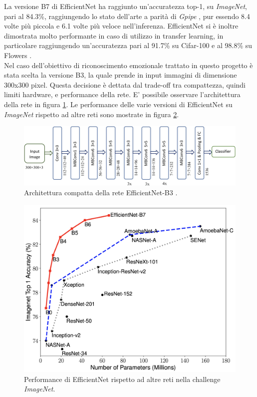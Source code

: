 \documentclass[11pt]{report}
\begin{document}
        La versione B7 di EfficientNet ha raggiunto un'accuratezza top-1, su \textit{ImageNet}, pari al 84.3\%, raggiungendo lo stato dell'arte a parità di \textit{Gpipe} \cite{huang2019gpipe}, pur essendo 8.4 volte più piccola e 6.1 volte più veloce nell'inferenza.
        EfficientNet si è inoltre dimostrata molto performante in caso di utilizzo in transfer learning, in particolare raggiungendo un'accuratezza pari al 91.7\% su Cifar-100 \cite{cifar} e al 98.8\% su Flowers \cite{flowers}.\\
        
        Nel caso dell'obiettivo di riconoscimento emozionale trattato in questo progetto è stata scelta la versione B3, la quale prende in input immagini di dimensione 300x300 pixel. Questa decisione è dettata dal trade-off tra compattezza, quindi limiti hardware, e performance della rete. E' possibile osservare l'architettura della rete in figura \ref{fig:efficientnet-arch}.
        Le performance delle varie versioni di EfficientNet su \textit{ImageNet} rispetto ad altre reti sono mostrate in figura \ref{fig:efficientnet}.

\begin{figure}[h]
    \centering
    \includegraphics[scale=2]{img/Schematic-representation-of-EfficientNet-B3.png}
    \caption{Architettura compatta della rete EfficientNet-B3 \cite{effnetb3-arch}.}
    \label{fig:efficientnet-arch}
\end{figure}

\newpage


\begin{figure}
    \centering
    \includegraphics[scale=0.2]{img/efficientnet-performance.png}
    \caption{Performance di EfficientNet rispetto ad altre reti nella challenge \textit{ImageNet}.}
    \label{fig:efficientnet}
\end{figure}
\end{document}
